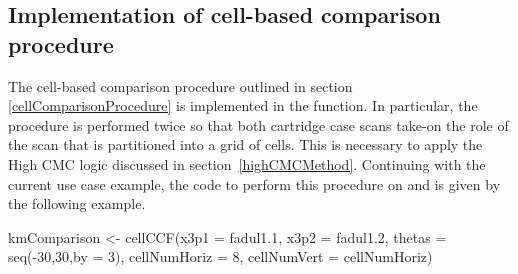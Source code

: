 



\subsection{Implementation of cell-based comparison procedure}

The cell-based comparison procedure outlined in section \ref{cellComparisonProcedure} is implemented in the  function. In particular, the procedure is performed twice so that both cartridge case scans take-on the role of the scan that is partitioned into a grid of cells. This is necessary to apply the High CMC logic discussed in section~\ref{highCMCMethod}. Continuing with the current use case example, the code to perform this procedure on  and  is given by the following example.
\begin{example*}
kmComparison <- cellCCF(x3p1 = fadul1.1,
                        x3p2 = fadul1.2,
                        thetas = seq(-30,30,by = 3),
                        cellNumHoriz = 8,
                        cellNumVert = cellNumHoriz)
\end{example*}

